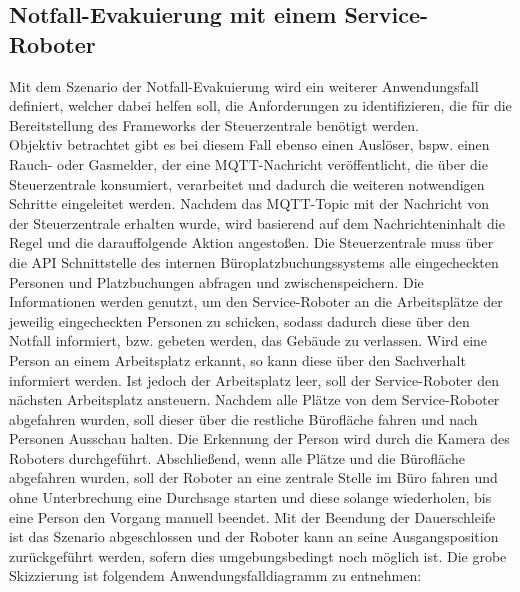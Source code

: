 \subsection{Notfall-Evakuierung mit einem Service-Roboter}
\label{subsec:evacuation}
    Mit dem Szenario der Notfall-Evakuierung wird ein weiterer Anwendungsfall definiert, welcher dabei helfen soll, die 
    Anforderungen zu identifizieren, die für die Bereitstellung des Frameworks der Steuerzentrale benötigt werden.
    \\
    \linebreak
    Objektiv betrachtet gibt es bei diesem Fall ebenso einen Auslöser, bspw. einen Rauch- 
    oder Gasmelder, der eine \acs{MQTT}-Nachricht veröffentlicht, die über die Steuerzentrale konsumiert, verarbeitet und dadurch die 
    weiteren notwendigen Schritte eingeleitet werden. Nachdem das \acs{MQTT}-Topic mit der Nachricht von der Steuerzentrale erhalten wurde, wird 
    basierend auf dem Nachrichteninhalt die Regel und die darauffolgende Aktion angestoßen. Die Steuerzentrale muss über die \acs{API} 
    Schnittstelle des internen Büroplatzbuchungssystems alle eingecheckten Personen und Platzbuchungen abfragen und 
    zwischenspeichern. Die Informationen werden genutzt, um den Service-Roboter an die Arbeitsplätze der jeweilig 
    eingecheckten Personen zu schicken, sodass dadurch diese über den Notfall informiert, bzw. gebeten werden, das 
    Gebäude zu verlassen. Wird eine Person an einem Arbeitsplatz erkannt, so kann diese über den Sachverhalt informiert 
    werden. Ist jedoch der Arbeitsplatz leer, soll der Service-Roboter den nächsten Arbeitsplatz ansteuern. Nachdem alle 
    Plätze von dem Service-Roboter abgefahren wurden, soll dieser über die restliche Bürofläche fahren und nach Personen 
    Ausschau halten. Die Erkennung der Person wird durch die Kamera des Roboters durchgeführt. Abschließend, wenn alle Plätze und die 
    Bürofläche abgefahren wurden, soll der Roboter an eine zentrale Stelle im Büro fahren und ohne Unterbrechung eine 
    Durchsage starten und diese solange wiederholen, bis eine Person den Vorgang manuell beendet. Mit der Beendung der Dauerschleife 
    ist das Szenario abgeschlossen und der Roboter kann an seine Ausgangsposition zurückgeführt werden, sofern dies 
    umgebungsbedingt noch möglich ist. Die grobe Skizzierung ist folgendem Anwendungsfalldiagramm zu entnehmen: 
